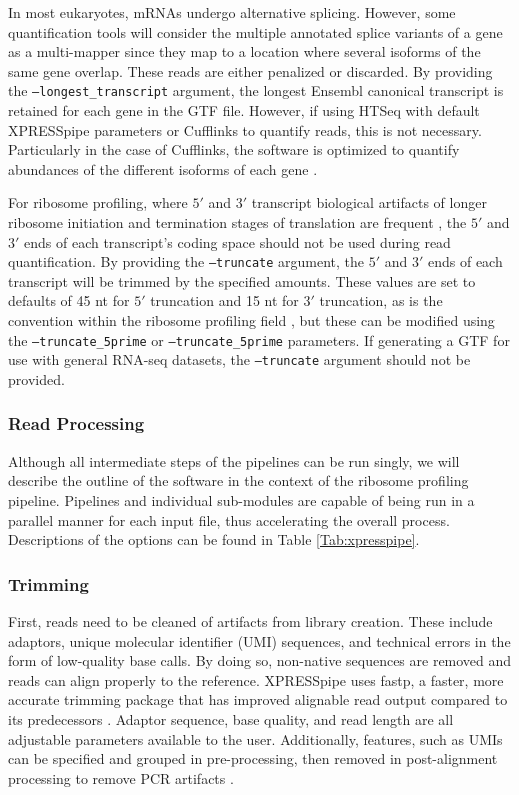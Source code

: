 \documentclass[10pt, oneside]{article}
\begin{document}
In most eukaryotes, mRNAs undergo alternative splicing. However, some quantification tools will consider the multiple annotated splice variants of a gene as a multi-mapper since they map to a location where several isoforms of the same gene overlap. These reads are either penalized or discarded. By providing the \texttt{--longest\_transcript} argument, the longest Ensembl canonical transcript \cite{ensembl_canon} is retained for each gene in the GTF file. However, if using HTSeq with default XPRESSpipe parameters or Cufflinks to quantify reads, this is not necessary. Particularly in the case of Cufflinks, the software is optimized to quantify abundances of the different isoforms of each gene \cite{cufflinks}. \par

For ribosome profiling, where $5'$ and $3'$ transcript biological artifacts of longer ribosome initiation and termination stages of translation are frequent \cite{ingolia_meth, weinberg_reports}, the $5'$ and $3'$ ends of each transcript's coding space should not be used during read quantification. By providing the \texttt{--truncate} argument, the $5'$ and $3'$ ends of each transcript will be trimmed by the specified amounts. These values are set to defaults of 45 nt for $5'$ truncation and 15 nt for $3'$ truncation, as is the convention within the ribosome profiling field \cite{ingolia_meth}, but these can be modified using the \texttt{--truncate\_5prime} or \texttt{--truncate\_5prime} parameters. If generating a GTF for use with general RNA-seq datasets, the \texttt{--truncate} argument should not be provided.

\subsubsection{Read Processing}
Although all intermediate steps of the pipelines can be run singly, we will describe the outline of the software in the context of the ribosome profiling pipeline. Pipelines and individual sub-modules are capable of being run in a parallel manner for each input file, thus accelerating the overall process. Descriptions of the options can be found in Table \ref{Tab:xpresspipe}.

\subsubsection{Trimming}
First, reads need to be cleaned of artifacts from library creation. These include adaptors, unique molecular identifier (UMI) sequences, and technical errors in the form of low-quality base calls. By doing so, non-native sequences are removed and reads can align properly to the reference. XPRESSpipe uses fastp, a faster, more accurate trimming package that has improved alignable read output compared to its predecessors \cite{fastp}. Adaptor sequence, base quality, and read length are all adjustable parameters available to the user. Additionally, features, such as UMIs can be specified and grouped in pre-processing, then removed in post-alignment processing to remove PCR artifacts \cite{umi, umitools}.
\end{document}
